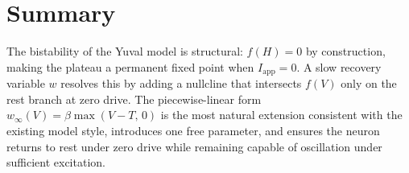 \documentclass[11pt]{article}
\begin{document}
\section{Summary}

The bistability of the Yuval model is structural: $f(H) = 0$ by construction, making
the plateau a permanent fixed point when $I_{\mathrm{app}} = 0$. A slow recovery
variable $w$ resolves this by adding a nullcline that intersects $f(V)$ only on the
rest branch at zero drive. The piecewise-linear form $w_\infty(V) = \beta\max(V-T,\,0)$
is the most natural extension consistent with the existing model style, introduces one
free parameter, and ensures the neuron returns to rest under zero drive while remaining
capable of oscillation under sufficient excitation.
\end{document}
